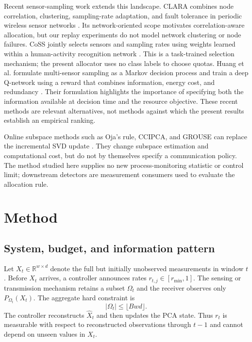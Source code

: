 \documentclass[12pt]{article}
\begin{document}
Recent sensor-sampling work extends this landscape. CLARA combines node
correlation, clustering, sampling-rate adaptation, and fault tolerance in
periodic wireless sensor networks \cite{harb2024clara}. Its network-oriented
scope motivates correlation-aware allocation, but our replay experiments do
not model network clustering or node failures. CoSS jointly selects sensors
and sampling rates using weights learned within a human-activity recognition
network \cite{liu2026coss}. This is a task-trained selection mechanism; the
present allocator uses no class labels to choose quotas. Huang et al. formulate
multi-sensor sampling as a Markov decision process and train a deep Q-network
using a reward that combines information, energy cost, and redundancy
\cite{huang2025dqn}. Their formulation highlights the importance of specifying
both the information available at decision time and the resource objective.
These recent methods are relevant alternatives, not methods against which the
present results establish an empirical ranking.

Online subspace methods such as Oja's rule, CCIPCA, and GROUSE can replace the
incremental SVD update \cite{oja1982simplified,weng2003ccipca,balzano2010grouse}.
They change subspace estimation and computational cost, but do not by themselves
specify a communication policy. The method studied here supplies no new
process-monitoring statistic or control limit; downstream detectors are
measurement consumers used to evaluate the allocation rule.

\section{Method}

\subsection{System, budget, and information pattern}

Let $X_t\in\mathbb{R}^{w\times d}$ denote the full but initially unobserved
measurements in window $t$. Before $X_t$ arrives, a controller announces rates
$r_{t,j}\in[r_{\min},1]$. The sensing or transmission mechanism retains a
subset $\Omega_t$ and the receiver observes only
$P_{\Omega_t}(X_t)$. The aggregate hard constraint is
\begin{equation}
 |\Omega_t|\leq \lfloor Bwd\rfloor .
\label{eq:hardbudget}
\end{equation}
The controller reconstructs $\widehat X_t$ and then updates the PCA state.
Thus $r_t$ is measurable with respect to reconstructed observations through
$t-1$ and cannot depend on unseen values in $X_t$.
\end{document}
